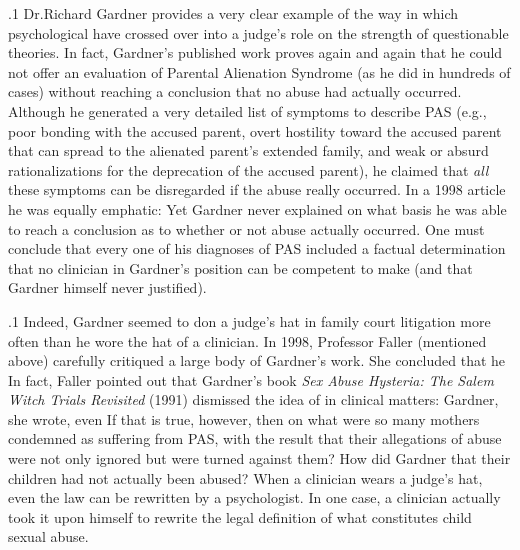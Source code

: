 \documentclass[11pt, twoside]{article}
\begin{document}
{\p.1{%
Dr.\@ Richard Gardner provides a very clear example of the way in which
psychological  have crossed over into a judge’s role on the
strength of questionable theories. In fact, Gardner’s published work
proves again and again that he could not offer an evaluation of Parental Alienation
Syndrome (as
he did in hundreds of cases) without reaching a conclusion that no abuse
had actually occurred. Although he generated a very detailed list of
symptoms to describe PAS (e.g., poor bonding with the accused parent,
overt hostility toward the accused parent that can spread to the alienated parent’s extended family, and weak or absurd rationalizations for
the deprecation of the accused parent), he claimed that \textit{all} these symptoms can be disregarded if the abuse really occurred. In a 1998 article
he was equally emphatic:  Yet Gardner never explained on what basis he was able to reach a conclusion as
to whether or not abuse actually occurred. One must conclude that every one of his diagnoses of PAS included a factual determination that
no clinician in Gardner’s position can be competent to make (and that
Gardner himself never justified).
}%

\p.1{%
Indeed, Gardner seemed to don a judge’s hat in family court litigation
more often than he wore the hat of a clinician. In 1998, Professor Faller
(mentioned above)
carefully critiqued a large body of Gardner’s work. She concluded that
he  In fact, Faller pointed out that Gardner’s book \textit{Sex Abuse
Hysteria: The Salem Witch Trials Revisited} (1991) dismissed the idea of
 in clinical matters:  Gardner, she wrote, even 
If that is true, however, then on what  were so many mothers
condemned as suffering from PAS, with the result that their allegations
of abuse were not only ignored but were turned against them? How did
Gardner  that their children had not actually been abused?
When a clinician wears a judge’s hat, even the law can be rewritten
by a psychologist. In one case, a clinician actually took it upon himself to rewrite the legal definition of what constitutes child sexual abuse.
}%

}
\end{document}
